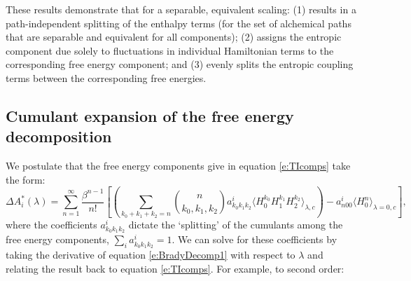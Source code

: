 \documentclass[%
 preprint,
 amsmath,amssymb,
 aps,
]{revtex4-1}
\begin{document}
These results demonstrate that for a separable, equivalent scaling: (1) results in a path-independent splitting of the enthalpy terms (for the set of alchemical paths that are separable and equivalent for all components); (2) assigns the entropic component due solely to fluctuations in individual Hamiltonian terms to the corresponding free energy component; and (3) evenly splits the entropic coupling terms between the corresponding free energies.

\subsection{Cumulant expansion of the free energy decomposition}
\label{s:CumultantInt}

We postulate that the free energy components give in equation \ref{e:TIcomps} take the form:
 \begin{equation}
\Delta A^*_i  (\lambda)=
\sum_{n=1}^{\infty}  \frac{\beta^{n-1}}{n!} 
\left[
\left(
 \sum_{k_0+k_1+k_2=n} 
{ n \choose k_0,k_1,k_2 } a^i_{k_0k_1k_2} \langle  H_0^{k_0} H_1^{k_1} H_2^{k_2} \rangle_{\lambda,c}
\right)
- a^i_{n00} \langle  H_0^{n}  \rangle_{\lambda=0,c}
\right],
\label{e:BradyDecomp1}
\end{equation}
where the coefficients $ a^i_{k_0k_1k_2}  $ dictate the `splitting' of the cumulants among the free energy components, 
$\sum_i a^i_{k_0k_1k_2} = 1$. 
We can solve for these coefficients by taking the derivative of equation \ref{e:BradyDecomp1} with respect to $\lambda$ and relating the result back to equation \ref{e:TIcomps}.  For example, to second order: 
\end{document}
